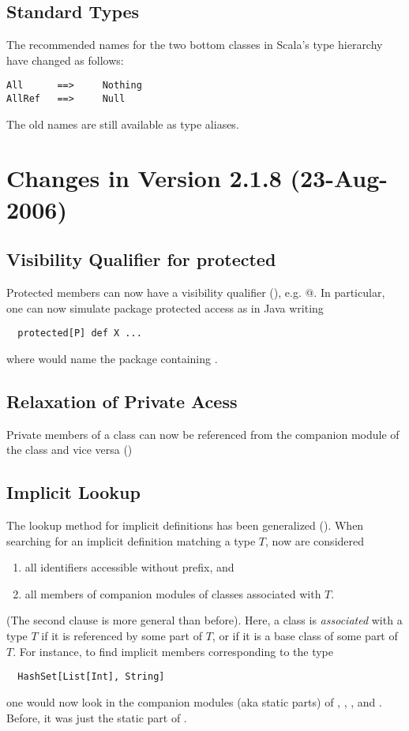 \subsection*{Standard Types} 

The recommended names for the two bottom classes in Scala's type
hierarchy have changed as follows:
\begin{lstlisting}
All      ==>     Nothing
AllRef   ==>     Null
\end{lstlisting}
The old names are still available as type aliases.

\section*{Changes in Version 2.1.8 (23-Aug-2006)}

\subsection*{Visibility Qualifier for protected}

Protected members can now have a visibility qualifier (),
e.g. \lstinline@protected[<qualifier>]@. In particular, one can now
simulate package protected access as in Java writing
\begin{lstlisting}
  protected[P] def X ...
\end{lstlisting}
where  would name the package containing .

\subsection*{Relaxation of Private Acess}

Private members of a class can now be referenced from the companion
module of the class and vice versa ()

\subsection*{Implicit Lookup}

The lookup method for implicit definitions has been generalized
(). 
When searching for an implicit definition matching a type $T$, now are
considered
\begin{enumerate}
\item all identifiers accessible without prefix, and
\item all members of companion modules of classes associated with $T$.
\end{enumerate}
(The second clause is more general than before). 
Here, a class is {\em associated} with a type $T$ if it is referenced
by some part of $T$, 
or if it is a base class of some part of $T$. 
For instance, to find implicit members corresponding to the type
\begin{lstlisting}
  HashSet[List[Int], String]
\end{lstlisting}
one would now look in the companion modules (aka static parts) of 
, , , and . 
Before, it was just the static part of .

